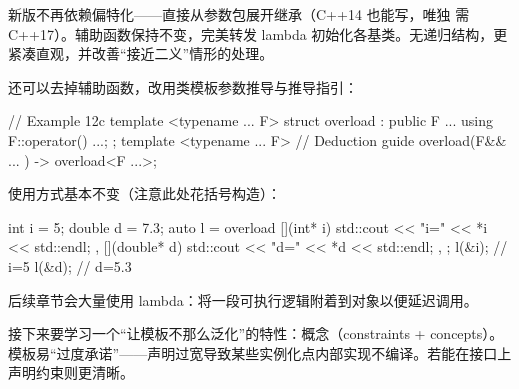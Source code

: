 新版不再依赖偏特化——直接从参数包展开继承（C++14 也能写，唯独  需 C++17）。辅助函数保持不变，完美转发 lambda 初始化各基类。无递归结构，更紧凑直观，并改善“接近二义”情形的处理。

还可以去掉辅助函数，改用类模板参数推导与推导指引：

\begin{code}
// Example 12c
template <typename ... F>
struct overload : public F ... {
  using F::operator() ...;
};
template <typename ... F> // Deduction guide
overload(F&& ... ) -> overload<F ...>;
\end{code}

使用方式基本不变（注意此处花括号构造）：

\begin{code}
int i = 5;
double d = 7.3;
auto l = overload{
  [](int* i) { std::cout << "i=" << *i << std::endl; },
  [](double* d) { std::cout << "d=" << *d << std::endl; },
};
l(&i);    // i=5
l(&d);    // d=5.3
\end{code}

后续章节会大量使用 lambda：将一段可执行逻辑附着到对象以便延迟调用。

接下来要学习一个“让模板不那么泛化”的特性：概念（constraints + concepts）。模板易“过度承诺”——声明过宽导致某些实例化点内部实现不编译。若能在接口上声明约束则更清晰。

